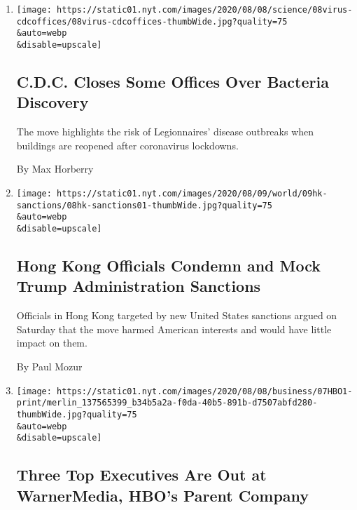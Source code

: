 \begin{enumerate}
\def\labelenumi{\arabic{enumi}.}
\item
  \href{/2020/08/08/health/cdc-legionnaires-coronavirus.html}{}

  \texttt{[image: https://static01.nyt.com/images/2020/08/08/science/08virus-cdcoffices/08virus-cdcoffices-thumbWide.jpg?quality=75\\\&auto=webp\\\&disable=upscale]}

  \hypertarget{cdc-closes-some-offices-over-bacteria-discovery}{%
  \subsection{C.D.C. Closes Some Offices Over Bacteria
  Discovery}\label{cdc-closes-some-offices-over-bacteria-discovery}}

  The move highlights the risk of Legionnaires' disease outbreaks when
  buildings are reopened after coronavirus lockdowns.

  By Max Horberry
\item
  \href{/2020/08/08/world/asia/hong-kong-sanctions-united-states.html}{}

  \texttt{[image: https://static01.nyt.com/images/2020/08/09/world/09hk-sanctions/08hk-sanctions01-thumbWide.jpg?quality=75\\\&auto=webp\\\&disable=upscale]}

  \hypertarget{hong-kong-officials-condemn-and-mock-trump-administration-sanctions}{%
  \subsection{Hong Kong Officials Condemn and Mock Trump Administration
  Sanctions}\label{hong-kong-officials-condemn-and-mock-trump-administration-sanctions}}

  Officials in Hong Kong targeted by new United States sanctions argued
  on Saturday that the move harmed American interests and would have
  little impact on them.

  By Paul Mozur
\item
  \href{/2020/08/07/business/media/hbo-warnermedia-executive-departure.html}{}

  \texttt{[image: https://static01.nyt.com/images/2020/08/08/business/07HBO1-print/merlin\_137565399\_b34b5a2a-f0da-40b5-891b-d7507abfd280-thumbWide.jpg?quality=75\\\&auto=webp\\\&disable=upscale]}

  \hypertarget{three-top-executives-are-out-at-warnermedia-hbos-parent-company}{%
  \subsection{Three Top Executives Are Out at WarnerMedia, HBO's Parent
  Company}\label{three-top-executives-are-out-at-warnermedia-hbos-parent-company}}


\end{enumerate}

